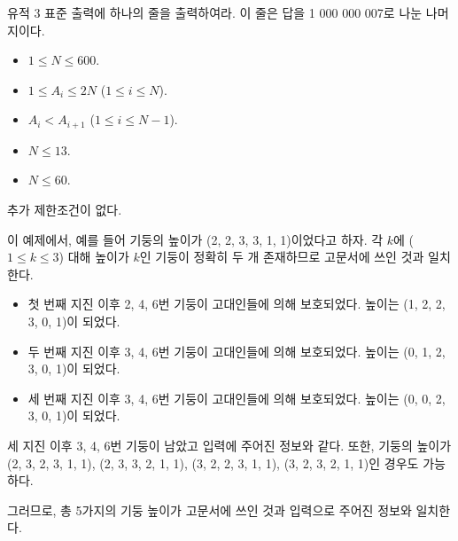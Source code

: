 \begin{problem}{유적 3}
	표준 출력에 하나의 줄을 출력하여라. 이 줄은 답을 1 000 000 007로 나눈 나머지이다.
	
	

	\Constraints


	\begin{itemize}
		
		\item $1 \le N \le 600$.
		\item $1 \le A_i \le 2N$ ($1 \le i \le N$).
		\item $A_i < A_{i+1}$ ($1 \le i \le N-1$).
	\end{itemize}


	\begin{itemize}
		\item $N \le 13$.
	\end{itemize}

	
	\begin{itemize}
		\item $N \le 60$.
	\end{itemize}
	
	
	추가 제한조건이 없다.
		
	\Examples
		
	\begin{example}
\end{example}

	이 예제에서, 예를 들어 기둥의 높이가 (2, 2, 3, 3, 1, 1)이었다고 하자. 각 $k$에 ($1 \le k \le 3$) 대해 높이가 $k$인 기둥이 정확히 두 개 존재하므로 고문서에 쓰인 것과 일치한다.

	\begin{itemize}
		\item 첫 번째 지진 이후 2, 4, 6번 기둥이 고대인들에 의해 보호되었다. 높이는 (1, 2, 2, 3, 0, 1)이 되었다.
		\item 두 번째 지진 이후 3, 4, 6번 기둥이 고대인들에 의해 보호되었다. 높이는 (0, 1, 2, 3, 0, 1)이 되었다.
		\item 세 번째 지진 이후 3, 4, 6번 기둥이 고대인들에 의해 보호되었다. 높이는 (0, 0, 2, 3, 0, 1)이 되었다.

	\end{itemize}

	세 지진 이후 3, 4, 6번 기둥이 남았고 입력에 주어진 정보와 같다. 또한, 기둥의 높이가 (2, 3, 2, 3, 1, 1), (2, 3, 3, 2, 1, 1), (3, 2, 2, 3, 1, 1), (3, 2, 3, 2, 1, 1)인 경우도 가능하다.
	
	그러므로, 총 5가지의 기둥 높이가 고문서에 쓰인 것과 입력으로 주어진 정보와 일치한다.



\end{problem}
